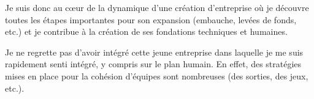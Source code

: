 Je suis donc au cœur de la dynamique d'une création d'entreprise où je découvre
toutes les étapes importantes pour son expansion (embauche, levées de fonds,
etc.) et je contribue à la création de ses fondations techniques et humaines.

Je ne regrette pas d'avoir intégré cette jeune entreprise dans laquelle je
me suis rapidement senti intégré, y compris sur le plan humain. En effet,
des stratégies mises en place pour la cohésion d'équipes sont nombreuses (des
sorties, des jeux, etc.).
